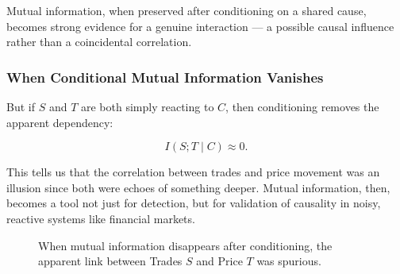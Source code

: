 \vspace{1em}
\noindent
Mutual information, when preserved after conditioning on a shared cause, becomes strong evidence for a genuine interaction — a possible causal influence rather than a coincidental correlation.

\subsubsection{When Conditional Mutual Information Vanishes}



But if \( S \) and \( T \) are both simply reacting to \( C \), then conditioning removes the apparent dependency:

\[
I(S; T \mid C) \approx 0.
\]

This tells us that the correlation between trades and price movement was an illusion since both were echoes of something deeper. Mutual information, then, becomes a tool not just for detection, but for validation of causality in noisy, reactive systems like financial markets.

\begin{figure}[H]
\centering
{}
\caption{When mutual information disappears after conditioning, the apparent link between Trades \( S \) and Price \( T \) was spurious.}
\end{figure}


